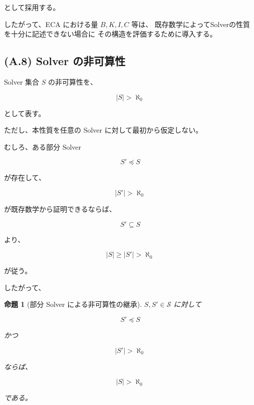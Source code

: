 \documentclass[a4paper,11pt]{article}
\newtheorem{proposition}[definition]{命題}
\newcommand{\Solver}{\mathcal{S}}
\newcommand{\SubSolver}{\preceq}
\begin{document}
として採用する。

したがって、ECA における量 $B,K,I,C$ 等は、
既存数学によってSolverの性質を十分に記述できない場合に
その構造を評価するために導入する。


\subsection{(A.8) Solver の非可算性}
\label{subsec:A8}

Solver 集合 $S$ の非可算性を、

\begin{equation}
    |S|>\aleph_0
    \label{eq:A-uncountable}
\end{equation}

として表す。

ただし、本性質を任意の Solver に対して最初から仮定しない。

むしろ、ある部分 Solver

\begin{equation}
    S'\SubSolver S
\end{equation}

が存在して、

\begin{equation}
    |S'|>\aleph_0
    \label{eq:A-uncountable-subsolver}
\end{equation}

が既存数学から証明できるならば、

\begin{equation}
    S'\subseteq S
\end{equation}

より、

\begin{equation}
    |S|
    \geq
    |S'|
    >
    \aleph_0
\end{equation}

が従う。

したがって、

\begin{proposition}[部分 Solver による非可算性の継承]
$S,S'\in\Solver$ に対して

\begin{equation}
    S'\SubSolver S
\end{equation}

かつ

\begin{equation}
    |S'|>\aleph_0
\end{equation}

ならば、

\begin{equation}
    \boxed{
        |S|>\aleph_0
    }
\end{equation}

である。
\end{proposition}
\end{document}
